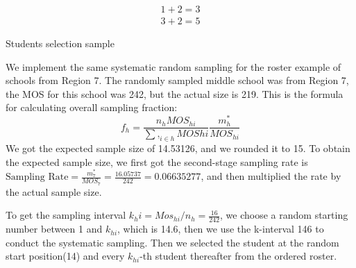 \documentclass[
  12pt]{article}
\begin{document}
\begin{align*}
1 + 2 = 3 \\
3 + 2 = 5
\end{align*}

Students selection sample

We implement the same systematic random sampling for the roster example
of schools from Region 7. The randomly sampled middle school was from
Region 7, the MOS for this school was 242, but the actual size is 219.
This is the formula for calculating overall sampling fraction: \[
f_h = \frac{n_h MOS_{hi} }{\sum,_{i \in h} MOS{hi} } \frac{m^*_h}{MOS_{hi}}
\] We got the expected sample size of 14.53126, and we rounded it to 15.
To obtain the expected sample size, we first got the second-stage
sampling rate is
\(\text{Sampling Rate} = \frac{m^*_{7}}{MOS_7} = \frac{16.05737}{242} = 0.06635277\),
and then multiplied the rate by the actual sample size.

To get the sampling interval \(k_hi = Mos_{hi} / n_h = \frac{16}{242}\),
we choose a random starting number between 1 and \(k_{hi}\), which is
14.6, then we use the k-interval 146 to conduct the systematic sampling.
Then we selected the student at the random start position(14) and every
\(k_{hi}\)-th student thereafter from the ordered roster.
\end{document}

